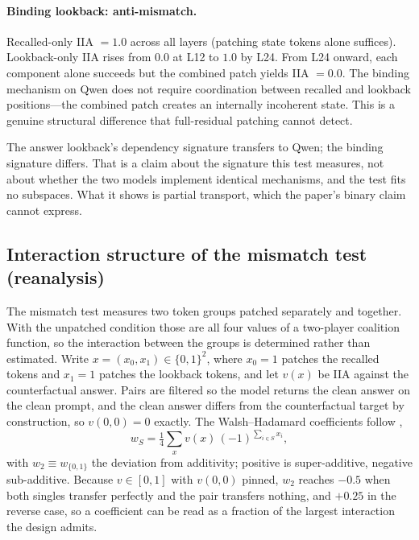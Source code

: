 \documentclass{article}
\begin{document}
\paragraph{Binding lookback: anti-mismatch.}
Recalled-only IIA $= 1.0$ across all layers (patching state tokens alone suffices). Lookback-only IIA rises from $0.0$ at L12 to $1.0$ by L24. From L24 onward, each component alone succeeds but the combined patch yields IIA $= 0.0$. The binding mechanism on Qwen does not require coordination between recalled and lookback positions---the combined patch creates an internally incoherent state. This is a genuine structural difference that full-residual patching cannot detect.

The answer lookback's dependency signature transfers to Qwen; the binding signature differs. That is a claim about the signature this test measures, not about whether the two models implement identical mechanisms, and the test fits no subspaces. What it shows is partial transport, which the paper's binary claim cannot express.

\subsection{Interaction structure of the mismatch test (reanalysis)}
\label{sec:interaction}

The mismatch test measures two token groups patched separately and together. With the
unpatched condition those are all four values of a two-player coalition function, so the
interaction between the groups is determined rather than estimated. Write
$x = (x_0, x_1) \in \{0,1\}^2$, where $x_0 = 1$ patches the recalled tokens and $x_1 = 1$
patches the lookback tokens, and let $v(x)$ be IIA against the counterfactual answer. Pairs
are filtered so the model returns the clean answer on the clean prompt, and the clean answer
differs from the counterfactual target by construction, so $v(0,0) = 0$ exactly. The
Walsh--Hadamard coefficients follow \citet{poelwijk2016context},
\begin{equation}
  w_S = \tfrac{1}{4} \sum_{x} v(x)\, (-1)^{\sum_{i \in S} x_i},
\end{equation}
with $w_2 \equiv w_{\{0,1\}}$ the deviation from additivity; positive is super-additive,
negative sub-additive. Because $v \in [0,1]$ with $v(0,0)$ pinned, $w_2$ reaches $-0.5$ when
both singles transfer perfectly and the pair transfers nothing, and $+0.25$ in the reverse
case, so a coefficient can be read as a fraction of the largest interaction the design admits.
\end{document}
